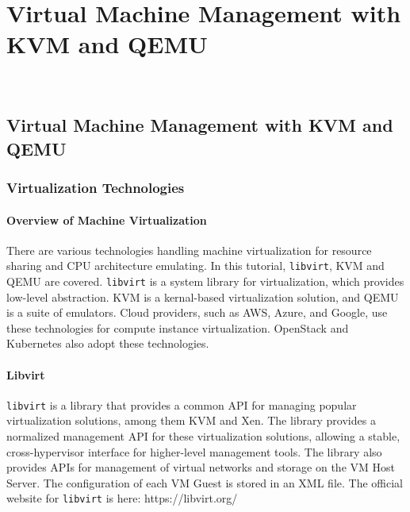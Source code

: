 \chapter{Virtual Machine Management with KVM and QEMU}
\FILENAME\

\hypertarget{virtual-machine-management-with-kvm-and-qemu}{%
\section{Virtual Machine Management with KVM and
QEMU}\label{virtual-machine-management-with-kvm-and-qemu}}

\hypertarget{virtualization-technologies}{%
\subsection{Virtualization
Technologies}\label{virtualization-technologies}}

\hypertarget{overview-of-machine-virtualization}{%
\subsubsection{Overview of Machine
Virtualization}\label{overview-of-machine-virtualization}}

There are various technologies handling machine virtualization for
resource sharing and CPU architecture emulating. In this tutorial,
\texttt{libvirt}, KVM and QEMU are covered. \texttt{libvirt} is a system
library for virtualization, which provides low-level abstraction. KVM is
a kernal-based virtualization solution, and QEMU is a suite of
emulators. Cloud providers, such as AWS, Azure, and Google, use these
technologies for compute instance virtualization. OpenStack and
Kubernetes also adopt these technologies.

\hypertarget{libvirt}{%
\subsubsection{Libvirt}\label{libvirt}}

\texttt{libvirt} is a library that provides a common API for managing
popular virtualization solutions, among them KVM and Xen. The library
provides a normalized management API for these virtualization solutions,
allowing a stable, cross-hypervisor interface for higher-level
management tools. The library also provides APIs for management of
virtual networks and storage on the VM Host Server. The configuration of
each VM Guest is stored in an XML file. The official website for
\texttt{libvirt} is here: https://libvirt.org/

